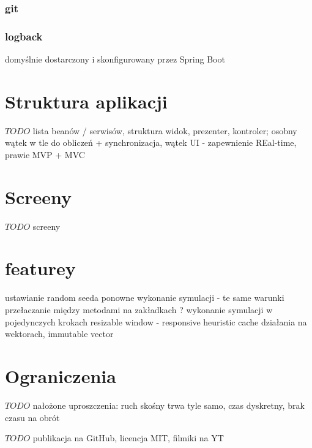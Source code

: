 \subsubsection{git}

\subsubsection{logback}
domyślnie dostarczony i skonfigurowany przez Spring Boot


\section{Struktura aplikacji}
$TODO$ lista beanów / serwisów, struktura widok, prezenter, kontroler; osobny wątek w tle do obliczeń + synchronizacja, wątek UI - zapewnienie REal-time, prawie MVP + MVC


\section{Screeny}
$TODO$ screeny

\section{featurey}
ustawianie random seeda
ponowne wykonanie symulacji - te same warunki
przełaczanie między metodami na zakładkach ?
wykonanie symulacji w pojedynczych krokach
resizable window - responsive
heuristic cache
działania na wektorach, immutable vector

\section{Ograniczenia}
$TODO$ nałożone uproszczenia: ruch skośny trwa tyle samo, czas dyskretny, brak czasu na obrót

$TODO$ publikacja na GitHub, licencja MIT, filmiki na YT